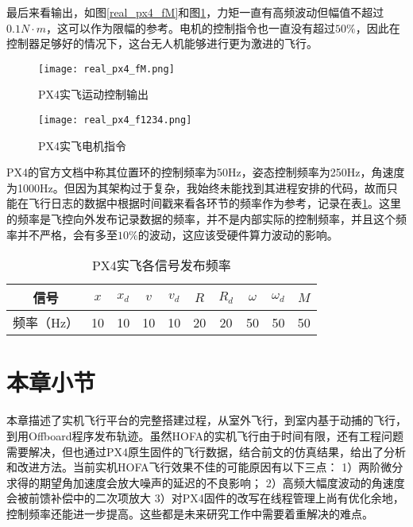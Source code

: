 最后来看输出，如图\ref{real_px4_fM}和图\ref{real_px4_f1234}，力矩一直有高频波动但幅值不超过$0.1N\cdot m$，这可以作为限幅的参考。电机的控制指令也一直没有超过$50\%$，因此在控制器足够好的情况下，这台无人机能够进行更为激进的飞行。
\begin{figure}[!h]
  \centering
  \begin{minipage}[b]{0.49\linewidth}
      \texttt{[image: real\_px4\_fM.png]}
      \caption{PX4实飞运动控制输出}
      \label{real_px4_fM}
  \end{minipage}
  \hfill %
  \begin{minipage}[b]{0.49\linewidth}
      \texttt{[image: real\_px4\_f1234.png]}
      \caption{PX4实飞电机指令}
      \label{real_px4_f1234}
  \end{minipage}
\end{figure}


PX4的官方文档中称其位置环的控制频率为50Hz，姿态控制频率为250Hz，角速度为1000Hz\cite{px4}。但因为其架构过于复杂，我始终未能找到其进程安排的代码，故而只能在飞行日志的数据中根据时间戳来看各环节的频率作为参考，记录在表\ref{频率}。这里的频率是飞控向外发布记录数据的频率，并不是内部实际的控制频率，并且这个频率并不严格，会有多至$10\%$的波动，这应该受硬件算力波动的影响。
\begin{table}[!h]
  \centering
  \caption{PX4实飞各信号发布频率}
  \label{频率}
  \begin{tabular}{cccccccccc}
      \toprule
      信号&$x$ & $x_d$ & $v$ &$v_d$ &$R$ &$R_d$& $\omega$ &$\omega_d$ &$M$\\
      \midrule
频率（Hz）&10& 10& 10& 10& 20&20& 50 & 50&50\\
      \bottomrule
  \end{tabular}
\end{table}


\section{本章小节}
本章描述了实机飞行平台的完整搭建过程，从室外飞行，到室内基于动捕的飞行，到用Offboard程序发布轨迹。虽然HOFA的实机飞行由于时间有限，还有工程问题需要解决，但也通过PX4原生固件的飞行数据，结合前文的仿真结果，给出了分析和改进方法。当前实机HOFA飞行效果不佳的可能原因有以下三点：
1）两阶微分求得的期望角加速度会放大噪声的延迟的不良影响；
2）高频大幅度波动的角速度会被前馈补偿中的二次项放大
3）对PX4固件的改写在线程管理上尚有优化余地，控制频率还能进一步提高。这些都是未来研究工作中需要着重解决的难点。

